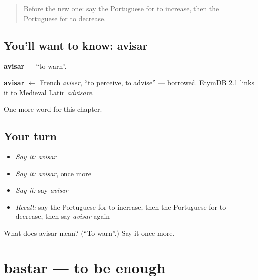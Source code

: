 \label{lesson:PT-C174-avisar}



\begin{quote}
Before the new one: say the Portuguese for to increase, then the Portuguese for to decrease.
\end{quote}

\subsection*{You'll want to know: avisar}
\textbf{avisar} — \textquotedblleft{}to warn\textquotedblright{}.

\begin{cousinweb}
\textbf{avisar} $\leftarrow$ French \emph{aviser}, \textquotedblleft{}to perceive, to advise\textquotedblright{} — borrowed. EtymDB 2.1 links it to Medieval Latin \emph{advisare}.
\end{cousinweb}

\begin{grammarlens}[title={What you've built}]
One more word for this chapter.
\end{grammarlens}

\subsection*{Your turn}
\begin{itemize}
\raggedright
  \item \emph{Say it:} \emph{avisar}
  \item \emph{Say it:} \emph{avisar}, once more
  \item \emph{Say it:} say \emph{avisar}
  \item \emph{Recall:} say the Portuguese for to increase, then the Portuguese for to decrease, then say \emph{avisar} again
\end{itemize}

\begin{tcolorbox}[breakable,colback=teal!4,colframe=teal!35!black,title={Before you move on}]
What does avisar mean? (\textquotedblleft{}To warn\textquotedblright{}.) Say it once more.
\end{tcolorbox}
\section[bastar]{bastar — to be enough}

\label{lesson:PT-C174-bastar}



